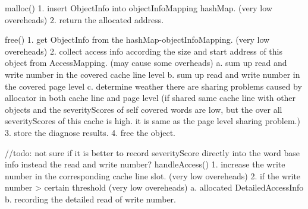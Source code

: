         malloc(){
            1. insert ObjectInfo into objectInfoMapping hashMap.   (very low overeheads)
            2. return the allocated address.
        }

        free(){
            1. get ObjectInfo from the hashMap-objectInfoMapping. (very low overeheads)
            2. collect access info according the size and start address of this object from AccessMapping.  (may cause some overheads)
                    a. sum up read and write number in the covered cache line level
                    b. sum up read and write number in the covered page level
                    c. determine weather there are sharing problems caused by allocator in both cache line and page level
                        (if shared same cache line with other objects and the severityScores of self covered words are low, but the over
                         all severityScores of this cache is high. it is same as the page level sharing problem.)
            3. store the diagnose results.
            4. free the object.
        }

        //todo: not sure if it is better to record severityScore directly into the word base info instead the read and write number?
        handleAccess(){
            1. increase the write number in the corresponding cache line slot.  (very low overeheads)
            2. if the write number > certain threshold                          (very low overeheads)
                      a. allocated DetailedAccessInfo
                      b. recording the detailed read of write number.
        }
